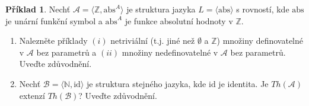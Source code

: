 \documentclass[a4paper]{article}
\theoremstyle{definition}
\newtheorem{problem}{Příklad}
\begin{document}
\medskip\begin{problem} %
Nechť $\mathcal{A}=\langle\mathbb{Z},\mathrm{abs}^A \rangle$ je struktura jazyka $L=\langle \mathrm{abs} \rangle$ s rovností, kde $\mathrm{abs}$ je unární funkční symbol a $\mathrm{abs}^A$ je funkce absolutní hodnoty v $\mathbb{Z}$.
\begin{enumerate}[label=(\alph*),noitemsep,topsep=6pt]
    
    \item Nalezněte příklady $(i)$ netriviální (t.j. jiné než $\emptyset$ a $\mathbb{Z}$) množiny definovatelné v $\mathcal{A}$ bez parametrů a $(ii)$ množiny nedefinovatelné v $\mathcal{A}$ bez parametrů. Uveďte zdůvodnění.
    \item Nechť $\mathcal{B}=\langle\mathbb{N},\mathrm{id} \rangle$ je struktura stejného jazyka, kde $\mathrm{id}$ je identita. Je $Th(\mathcal{A})$ extenzí $Th(\mathcal{B})$? Uveďte zdůvodnění.
\end{enumerate}
\end{problem}
\end{document}
